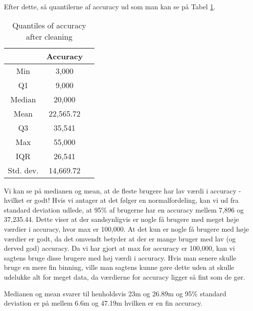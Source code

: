 Efter dette, så quantilerne af accuracy ud som man kan se på Tabel \ref{tab:acc_quantiles}. 
 \begin{table}[htbp]
        \centering
        \small
        \setlength\tabcolsep{2pt}
        \begin{tabular}{|c|c|c|}
            \hline
                         & Accuracy      \\[0pt]
            \hline
                 Min     &  3,000       \\
            \hline
                 Q1      &  9,000   \\
            \hline
                 Median  &  20,000    \\
            \hline
                 Mean    &  22,565.72    \\
            \hline
                 Q3      &  35,541      \\
            \hline
                 Max &  55,000   \\
            \hline
                 IQR     &   26,541     \\
            \hline
                Std. dev.  &  14,669.72   \\
            \hline
        \end{tabular}
        \caption{Quantiles of accuracy after cleaning} %
        \label{tab:acc_quantiles}
\end{table}

Vi kan se på medianen og mean, at de fleste brugere har lav værdi i accuracy - hvilket er godt! Hvis vi antager at det følger en normalfordeling, kan vi ud fra standard deviation udlede, at 95\% af brugerne har en accuracy mellem 7,896 og 37,235.44. Dette viser at der sandsynligvis er nogle få brugere med meget høje værdier i accuracy, hvor max er 100,000. At det kun er nogle få brugere med høje værdier er godt, da det omvendt betyder at der er mange bruger med lav (og derved god) accuracy. Da vi har gjort at max for accuracy er 100,000, kan vi sagtens bruge disse brugere med høj værdi i accuracy. Hvis man senere skulle bruge en mere fin binning, ville man sagtens kunne gøre dette uden at skulle udelukke alt for meget data, da værdierne for accuracy ligger så fint som de gør.  

Medianen og mean svarer til henholdsvis 23m og 26.89m og 95\% standard deviation er på mellem 6.6m og 47.19m hvilken er en fin accuracy. 


